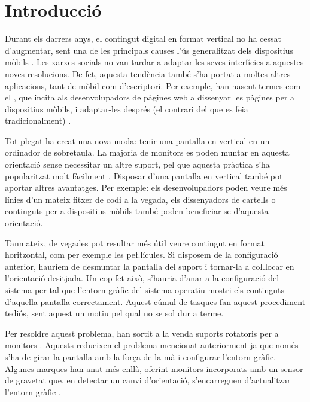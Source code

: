\chapter{Introducció}
\label{cap:introduccio}

Durant els darrers anys, el contingut digital en format vertical no ha cessat
d'augmentar, sent una de les principals causes l'ús generalitzat dels
dispositius mòbils \cite{Navarro2023El}. Les xarxes socials no van tardar a
adaptar les seves interfícies a aquestes noves resolucions. De fet, aquesta
tendència també s'ha portat a moltes altres aplicacions, tant de mòbil com
d'escriptori. Per exemple, han nascut termes com el
, que incita als desenvolupadors de pàgines web
a dissenyar les pàgines per a dispositius mòbils, i adaptar-les després
(el contrari del que es feia tradicionalment) \cite{varrela2015mobile}.

Tot plegat ha creat una nova moda: tenir una pantalla en vertical
en un ordinador de sobretaula. La majoria de monitors es poden muntar en
aquesta orientació sense necessitar un altre suport, pel que aquesta pràctica
s'ha popularitzat molt fàcilment \cite{WeardenPortrait}.
Disposar d'una pantalla en vertical també pot aportar altres avantatges. Per
exemple: els desenvolupadors poden veure més línies d'un mateix fitxer de codi
a la vegada, els dissenyadors de cartells o continguts per a dispositius mòbils
també poden beneficiar-se d'aquesta orientació.

Tanmateix, de vegades pot resultar més útil veure contingut en format
horitzontal, com per exemple les pe\l.lícules. Si disposem de la configuració
anterior, hauríem de desmuntar la pantalla del suport i tornar-la a co\l.locar
en l'orientació desitjada. Un cop fet això, s'hauria d'anar a la configuració
del sistema per tal que l'entorn gràfic del sistema operatiu mostri els continguts
d'aquella pantalla correctament. Aquest cúmul de tasques fan aquest procediment
tediós, sent aquest un motiu pel qual no se sol dur a terme.

Per resoldre aquest problema, han sortit a la venda suports rotatoris per a 
monitors \cite{DIGITUSUniversal}. Aquests redueixen el problema mencionat
anteriorment ja que només s'ha de girar la pantalla amb la força de la mà i
configurar l'entorn gràfic. Algunes marques han anat més enllà, oferint
monitors incorporats amb un sensor de gravetat que, en detectar un canvi
d'orientació, s'encarreguen d'actualitzar l'entorn gràfic \cite{LCLC}.

